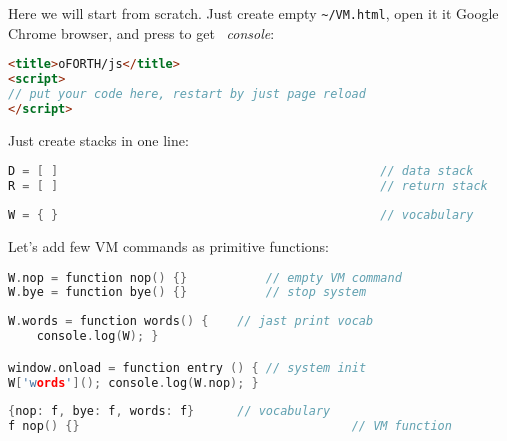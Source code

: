 \clearpage{}\label{jsvm}\secdown

Here we will start from scratch. Just create empty \verb|~/VM.html|, open it it
Google Chrome browser, and press  to get \js\ \emph{console}:
\begin{lstlisting}[language=html]
<title>oFORTH/js</title>
<script>
// put your code here, restart by just page reload
</script>
\end{lstlisting}

\noindent
Just create stacks in one line:

\begin{lstlisting}[language=c++]
D = [ ]												// data stack
R = [ ]												// return stack
\end{lstlisting}

\clearpage
\begin{lstlisting}[language=c++]
W = { }												// vocabulary
\end{lstlisting}

\noindent
Let's add few VM commands as primitive functions:

\begin{lstlisting}[language=c++]
W.nop = function nop() {}			// empty VM command
W.bye = function bye() {}			// stop system
\end{lstlisting}

\begin{lstlisting}[language=c++]
W.words = function words() {	// jast print vocab
	console.log(W); }

window.onload = function entry () {	// system init
W['words'](); console.log(W.nop); }
\end{lstlisting}

\begin{lstlisting}[language=c++]
{nop: f, bye: f, words: f}		// vocabulary
f nop() {}										// VM function
\end{lstlisting}

\secup
